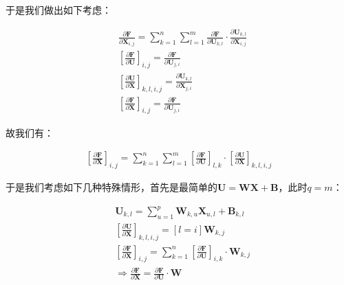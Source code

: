 \documentclass[UTF8]{book}
\begin{document}
于是我们做出如下考虑：
\begin{large}
    \begin{equation}
        \begin{aligned}
            &\frac{\partial \mathbf{F}}{\partial \mathbf{X}_{i,j}} = \sum_{k=1}^{n}\sum_{l=1}^{m} \frac{\partial\mathbf{F}}{\partial \mathbf{U}_{k,l}} \cdot \frac{\partial \mathbf{U}_{k,l}}{\partial \mathbf{X}_{i,j}} \\
            &\left[\frac{\partial \mathbf{F}}{\partial \mathbf{U}}\right]_{i,j} = \frac{\partial \mathbf{F}}{\partial \mathbf{U}_{j,i}} \\
            &\left[\frac{\partial \mathbf{U}}{\partial \mathbf{X}}\right]_{k,l,i,j} = \frac{\partial \mathbf{U}_{k,l}}{\partial \mathbf{X}_{j,i}} \\
            &\left[ \frac{\partial \mathbf{F}}{\partial \mathbf{X}} \right]_{i,j}=\frac{\partial \mathbf{F}}{\partial \mathbf{U}_{j,i}}
            \nonumber
        \end{aligned}
    \end{equation}
\end{large}
故我们有：
\begin{large}
    \begin{equation}
        \begin{aligned}
            \left[\frac{\partial \mathbf{F}}{\partial \mathbf{X}}\right]_{i,j}=\sum_{k=1}^{n}\sum_{l=1}^{m}\left[\frac{\partial \mathbf{F}}{\partial \mathbf{U}}\right]_{l,k} \cdot \left[ \frac{\partial \mathbf{U}}{\partial \mathbf{X}} \right]_{k,l,i,j}
            \nonumber
        \end{aligned}
    \end{equation}
\end{large}
于是我们考虑如下几种特殊情形，首先是最简单的$\mathbf{U}=\mathbf{W}\mathbf{X}+\mathbf{B}$，此时$q=m$：
\begin{large}
    \begin{equation}
        \begin{aligned}
            &\mathbf{U}_{k,l}=\sum_{u=1}^{p}\mathbf{W}_{k,u}\mathbf{X}_{u,l}+\mathbf{B}_{k,l} \\
            &\left[ \frac{\partial \mathbf{U}}{\partial \mathbf{X}}\right]_{k,l,i,j}=[l=i]\mathbf{W}_{k,j} \\
            &\left[ \frac{\partial \mathbf{F}}{\partial \mathbf{X}} \right]_{i,j}=\sum_{k=1}^{n} \left[ \frac{\partial \mathbf{F}}{\partial \mathbf{U}} \right]_{i,k} \cdot \mathbf{W}_{k,j} \\
            &\Rightarrow \frac{\partial \mathbf{F}}{\partial \mathbf{X}} = \frac{\partial \mathbf{F}}{\partial \mathbf{U}} \cdot \mathbf{W}
            \nonumber
        \end{aligned}
    \end{equation}
\end{large}
\end{document}

